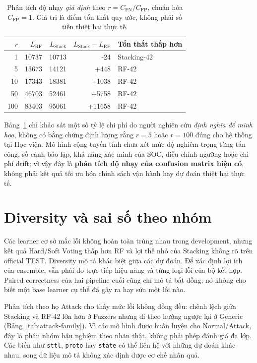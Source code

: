 \begin{table}[htbp]\centering\small
\renewcommand{\arraystretch}{1.23}
\caption{Phân tích độ nhạy \emph{giả định} theo $r=C_{\mathrm{FN}}/C_{\mathrm{FP}}$, chuẩn hóa $C_{\mathrm{FP}}=1$. Giá trị là điểm tổn thất quy ước, không phải số tiền thiệt hại thực tế.}
\label{tab:v4-cost-sensitivity}
\begin{tabular}{rrrrl}\toprule
$r$ & $L_{\mathrm{RF}}$ & $L_{\mathrm{Stack}}$ & $L_{\mathrm{Stack}}-L_{\mathrm{RF}}$ & Tổn thất thấp hơn\\\midrule
1 & 10737 & 10713 & -24 & Stacking-42\\
5 & 13673 & 14121 & +448 & RF-42\\
10 & 17343 & 18381 & +1038 & RF-42\\
50 & 46703 & 52461 & +5758 & RF-42\\
100 & 83403 & 95061 & +11658 & RF-42\\\bottomrule
\end{tabular}
\end{table}

Bảng~\ref{tab:v4-cost-sensitivity} chỉ khảo sát một số tỷ lệ chi phí do người nghiên cứu \emph{định nghĩa để minh họa}, không có bằng chứng định lượng rằng $r=5$ hoặc $r=100$ đúng cho hệ thống tại Học viện. Mô hình cộng tuyến tính chưa xét mức độ nghiêm trọng từng tấn công, số cảnh báo lặp, khả năng xác minh của SOC, điều chỉnh ngưỡng hoặc chi phí drift; vì vậy đây là \textbf{phân tích độ nhạy của confusion matrix hiện có}, không phải kết quả tối ưu hóa chính sách vận hành hay dự đoán thiệt hại thực tế.


\section{Diversity và sai số theo nhóm}
\label{sec:discussion-diversity-families}

Các learner cơ sở mắc lỗi không hoàn toàn trùng nhau trong development, nhưng kết quả Hard/Soft Voting thấp hơn RF và lợi thế nhỏ của Stacking không rõ trên official TEST. Diversity mô tả khác biệt giữa các dự đoán. Để xác định lợi ích của ensemble, vẫn phải đo trực tiếp hiệu năng và từng loại lỗi của bộ kết hợp. Paired correctness của hai pipeline cuối cũng chỉ mô tả bất đồng; nó không cho biết một base learner cụ thể đã gây ra hay sửa một lỗi nào.

Phân tích theo họ Attack cho thấy mức lỗi không đồng đều: chênh lệch giữa Stacking và RF-42 lớn hơn ở Fuzzers nhưng đi theo hướng ngược lại ở Generic (Bảng~\ref{tab:attack-family}). Vì các mô hình được huấn luyện cho Normal/Attack, đây là phân nhóm hậu nghiệm theo nhãn thật, không phải phép đánh giá đa lớp. Các biến như \texttt{sttl}, \texttt{proto} hay \texttt{state} có thể liên hệ với những dự đoán khác nhau, song dữ liệu mô tả không xác định được cơ chế nhân quả.

